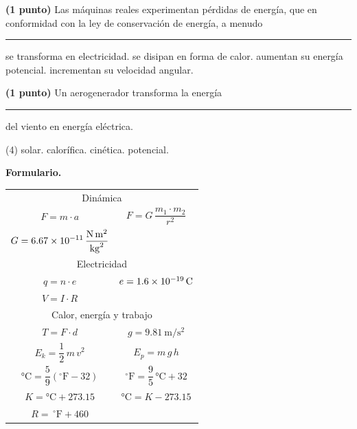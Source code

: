 \documentclass[12pt, letter]{exam}
\begin{document}
\begin{questions}
    \question \textbf{(1 punto)} Las máquinas reales experimentan pérdidas de energía, que en conformidad con la ley de conservación de energía, a menudo \rule{2cm}{0.1mm}
    \begin{multicols}{2}
    \begin{tasks}
        \task se transforma en electricidad.
        \task se disipan en forma de calor.
        \task aumentan su energía potencial.
        \task incrementan su velocidad angular.
    \end{tasks}
    \end{multicols}
    \question \textbf{(1 punto)} Un aerogenerador transforma la energía \rule{2cm}{0.1mm} del viento en energía eléctrica.
    \begin{tasks}(4)
        \task solar.
        \task calorífica.
        \task cinética.
        \task potencial.
    \end{tasks}
\end{questions}

\vspace*{1cm}
\textbf{\huge{Formulario.}}
\begin{table}[H]
\centering
\setlength{\tabcolsep}{40pt}
\renewcommand{\arraystretch}{1.5}
\begin{tabular}{c  c}
    \multicolumn{2}{c}{Dinámica} \\
    $F = m \cdot a$ & $F = G \, \dfrac{m_{1} \cdot m_{2}}{r^{2}}$ \\
    $G = \displaystyle \SI[per-mode=fraction]{6.67d-11}{\newton\square\meter\per\square\kilo\gram}$ &  \\ \hline
    \multicolumn{2}{c}{Electricidad} \\
    $q = n \cdot e$ & $e = \SI{1.6d-19}{\coulomb}$ \\
    $V = I \cdot R$ & \\
    \hline
    \multicolumn{2}{c}{Calor, energía y trabajo} \\
    $T = F \cdot d$ & $g = \displaystyle \SI{9.81}{\meter\per\square\second}$ \\
    $E_{k} = \dfrac{1}{2} \, m \, v^{2}$ & $E_{p} = m \, g \, h$ \\
    $\unit{\degreeCelsius} = \dfrac{5}{9} \left( ^{\circ}\text{F} - 32 \right)$ & $^{\circ}\text{F} = \dfrac{9}{5} \, \unit{\degreeCelsius} + 32$ \\
    $K = \unit{\degreeCelsius} + 273.15$ & $\unit{\degreeCelsius} = K - 273.15$ \\
    $R = \, ^{\circ}\text{F} + 460$ & \\
\end{tabular}
\end{table}
\end{document}
